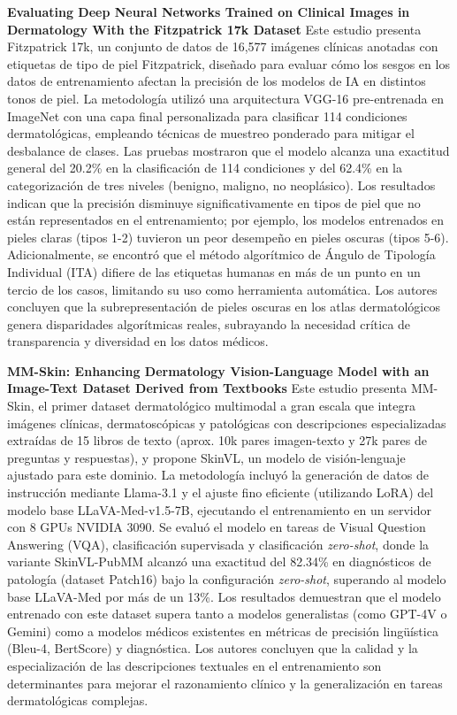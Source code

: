 \documentclass[11pt, a4paper]{article}
\begin{document}
\textbf{Evaluating Deep Neural Networks Trained on Clinical Images in Dermatology With the Fitzpatrick 17k Dataset} \cite{groh_evaluating_2021}
Este estudio presenta Fitzpatrick 17k, un conjunto de datos de 16,577 imágenes clínicas anotadas con etiquetas de tipo de piel Fitzpatrick, diseñado para evaluar cómo los sesgos en los datos de entrenamiento afectan
la precisión de los modelos de IA en distintos tonos de piel. La metodología utilizó una arquitectura VGG-16 pre-entrenada en ImageNet con una capa final personalizada para clasificar 114 condiciones dermatológicas,
empleando técnicas de muestreo ponderado para mitigar el desbalance de clases. Las pruebas mostraron que el modelo alcanza una exactitud general del 20.2\% en la clasificación de 114 condiciones y del 62.4\% en la
categorización de tres niveles (benigno, maligno, no neoplásico). Los resultados indican que la precisión disminuye significativamente en tipos de piel que no están representados en el entrenamiento; por ejemplo, los
modelos entrenados en pieles claras (tipos 1-2) tuvieron un peor desempeño en pieles oscuras (tipos 5-6). Adicionalmente, se encontró que el método algorítmico de Ángulo de Tipología Individual (ITA) difiere de las
etiquetas humanas en más de un punto en un tercio de los casos, limitando su uso como herramienta automática. Los autores concluyen que la subrepresentación de pieles oscuras en los atlas dermatológicos genera 
disparidades algorítmicas reales, subrayando la necesidad crítica de transparencia y diversidad en los datos médicos.

\textbf{MM-Skin: Enhancing Dermatology Vision-Language Model with an Image-Text Dataset Derived from Textbooks} \cite{zeng_mm-skin_2025}
Este estudio presenta MM-Skin, el primer dataset dermatológico multimodal a gran escala que integra imágenes clínicas, dermatoscópicas y patológicas con descripciones especializadas extraídas de 15 libros de texto
(aprox. 10k pares imagen-texto y 27k pares de preguntas y respuestas), y propone SkinVL, un modelo de visión-lenguaje ajustado para este dominio. La metodología incluyó la generación de datos de instrucción mediante
Llama-3.1 y el ajuste fino eficiente (utilizando LoRA) del modelo base LLaVA-Med-v1.5-7B, ejecutando el entrenamiento en un servidor con 8 GPUs NVIDIA 3090. Se evaluó el modelo en tareas de Visual Question Answering
(VQA), clasificación supervisada y clasificación \textit{zero-shot}, donde la variante SkinVL-PubMM alcanzó una exactitud del 82.34\% en diagnósticos de patología (dataset Patch16) bajo la configuración 
\textit{zero-shot}, superando al modelo base LLaVA-Med por más de un 13\%. Los resultados demuestran que el modelo entrenado con este dataset supera tanto a modelos generalistas (como GPT-4V o Gemini) como a modelos
médicos existentes en métricas de precisión lingüística (Bleu-4, BertScore) y diagnóstica. Los autores concluyen que la calidad y la especialización de las descripciones textuales en el entrenamiento son determinantes
para mejorar el razonamiento clínico y la generalización en tareas dermatológicas complejas.
\end{document}
